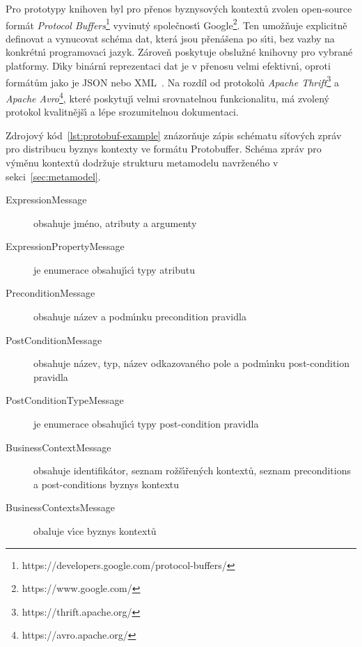Pro prototypy knihoven byl pro přenos byznysových kontextů zvolen open-source formát
\textit{Protocol Buffers}\footnote{https://developers.google.com/protocol-buffers/}\cite{varda2008protocol}
vyvinut\'y společnost\'{\i} Google\footnote{https://www.google.com/}.
Ten umožňuje explicitně definovat a vynucovat schéma dat,
která jsou přenášena po s\'{\i}ti, bez vazby na konkrétn\'{\i} programovac\'{\i}
jazyk. Zároveň poskytuje obslužné knihovny pro vybrané platformy.
D\'{\i}ky binárn\'{\i} reprezentaci dat je v přenosu velmi efektivn\'{\i},
oproti formátům jako je \gls{JSON} nebo \gls{XML}~\cite{maeda2012performance}.
Na rozdíl od protokolů \textit{Apache Thrift}\footnote{https://thrift.apache.org/}
a \textit{Apache Avro}\footnote{https://avro.apache.org/}, které poskytuj\'{\i}
velmi srovnatelnou funkcionalitu, má zvolený protokol kvalitnějš\'{\i} a lépe
srozumitelnou dokumentaci.



Zdrojov\'y kód~\ref{lst:protobuf-example} znázorňuje zápis schématu
síťových zpráv pro distribucu byznys kontexty ve formátu Protobuffer.
Schéma zpráv pro v\'yměnu kontextů dodržuje strukturu metamodelu navrženého
v sekci~\ref{sec:metamodel}.

\begin{description}
    \item [ExpressionMessage] obsahuje jméno, atributy a argumenty 
    \item [ExpressionPropertyMessage] je enumerace obsahuj\'{\i}c\'{\i} typy atributu 
    \item [PreconditionMessage] obsahuje název a podm\'{\i}nku precondition pravidla
    \item [PostConditionMessage] obsahuje název, typ, název odkazovaného pole a podm\'{\i}nku post-condition pravidla
    \item [PostConditionTypeMessage] je enumerace obsahuj\'{\i}c\'{\i} typy post-condition pravidla
    \item [BusinessContextMessage] obsahuje identifikátor, seznam rožš\'{\i}řen\'ych kontextů, seznam preconditions a post-conditions byznys kontextu
    \item [BusinessContextsMessage] obaluje v\'{\i}ce byznys kontextů
\end{description}

